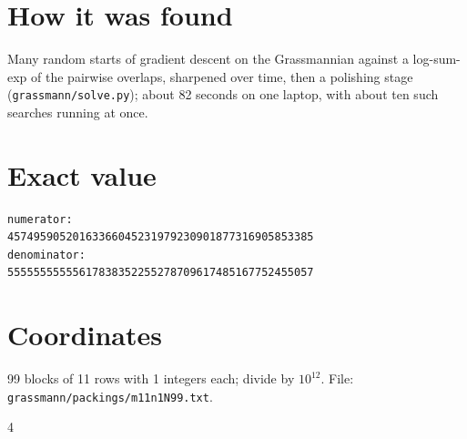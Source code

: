 \documentclass[11pt,a4paper]{article}
\begin{document}
\section{How it was found}
Many random starts of gradient descent on the Grassmannian against a log-sum-exp of the pairwise overlaps, sharpened over time, then a polishing stage (\texttt{grassmann/solve.py}); about 82 seconds on one laptop, with about ten such searches running at once.


\appendix
\section{Exact value}
{\small
\begin{verbatim}
numerator:
45749590520163366045231979230901877316905853385
denominator:
55555555555617838352255278709617485167752455057
\end{verbatim}}

\section{Coordinates}
99 blocks of 11 rows with 1 integers each; divide by $10^{12}$. File: \texttt{grassmann/packings/m11n1N99.txt}.
{\tiny
\begin{multicols}{4}
\end{multicols}}
\end{document}

